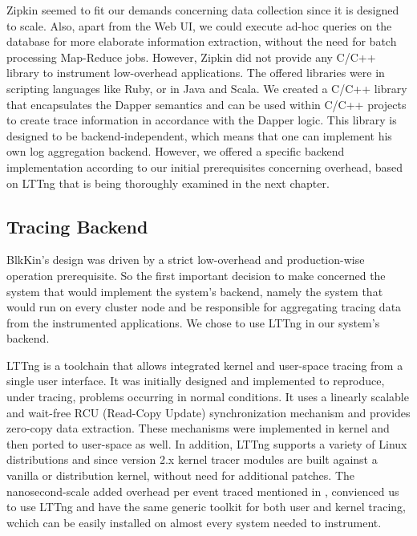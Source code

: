 \documentclass[a4paper,10pt,twocolumn]{article}
\begin{document}
Zipkin seemed to fit our demands concerning data collection since it is
designed to scale. Also, apart from the Web UI, we could execute ad-hoc queries
on the database for more elaborate information extraction, without the need for
batch processing Map-Reduce jobs. However, Zipkin did not provide any C/C++
library to instrument low-overhead applications. The offered libraries were in
scripting languages like Ruby, or in Java and Scala. We created a C/C++ library
that encapsulates the Dapper semantics and can be used within C/C++ projects to
create trace information in accordance with the Dapper logic.  This library is
designed to be backend-independent, which means that one can implement his own
log aggregation backend.  However, we offered a specific backend implementation
according to our initial prerequisites concerning overhead, based on LTTng that
is being thoroughly examined in the next chapter.

\subsection{Tracing Backend}

BlkKin's design was driven by a strict low-overhead and production-wise
operation prerequisite. So the first important decision to make concerned the
system that would implement the system's backend, namely the system that would
run on every cluster node and be responsible for aggregating tracing data from
the instrumented applications. We chose to use LTTng in our system's backend.

LTTng is a toolchain that allows integrated kernel and user-space tracing from
a single user interface. It was initially designed and implemented to
reproduce, under tracing, problems occurring in normal conditions. It uses a
linearly scalable and wait-free RCU (Read-Copy Update) synchronization
mechanism and provides zero-copy data extraction. These mechanisms were
implemented in kernel and then ported to user-space as well. In addition, LTTng
supports a variety of Linux distributions and since version 2.x kernel tracer
modules are built against a vanilla or distribution kernel, without need for
additional patches. The nanosecond-scale added overhead per event traced
mentioned in \cite{desnoyer}, convienced us to use LTTng and have the same
generic toolkit for both user and kernel tracing, wchich can be easily
installed on almost every system needed to instrument. 
\end{document}
